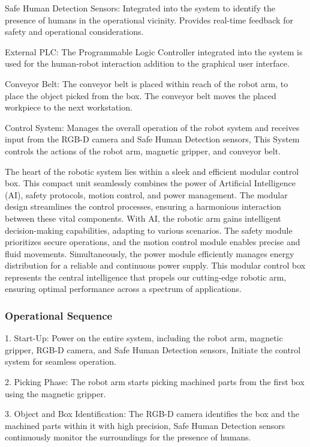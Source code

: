 {Safe Human Detection Sensors: Integrated into the system to identify the presence of humans in the operational vicinity. Provides real-time feedback for safety and operational considerations.

External PLC: The Programmable Logic Controller integrated into the system is used for the human-robot interaction addition to the graphical user interface.

Conveyor Belt: The conveyor belt is placed within reach of the robot arm, to place the object picked from the box. The conveyor belt moves the placed workpiece to the next workstation.

Control System: Manages the overall operation of the robot system and receives input from the RGB-D camera and Safe Human Detection sensors, This System controls the actions of the robot arm, magnetic gripper, and conveyor belt.

The heart of the robotic system lies within a sleek and efficient modular control box. This compact unit seamlessly combines the power of Artificial Intelligence (AI), safety protocols, motion control, and power management. The modular design streamlines the control processes, ensuring a harmonious interaction between these vital components. With AI, the robotic arm gains intelligent decision-making capabilities, adapting to various scenarios. The safety module prioritizes secure operations, and the motion control module enables precise and fluid movements. Simultaneously, the power module efficiently manages energy distribution for a reliable and continuous power supply. This modular control box represents the central intelligence that propels our cutting-edge robotic arm, ensuring optimal performance across a spectrum of applications.

\subsubsection{Operational Sequence}

1. Start-Up: Power on the entire system, including the robot arm, magnetic gripper, RGB-D camera, and Safe Human Detection sensors, Initiate the control system for seamless operation.

2. Picking Phase: The robot arm starts picking machined parts from the first box using the magnetic gripper.

3. Object and Box Identification: The RGB-D camera identifies the box and the machined parts within it with high precision, Safe Human Detection sensors continuously monitor the surroundings for the presence of humans.

}
